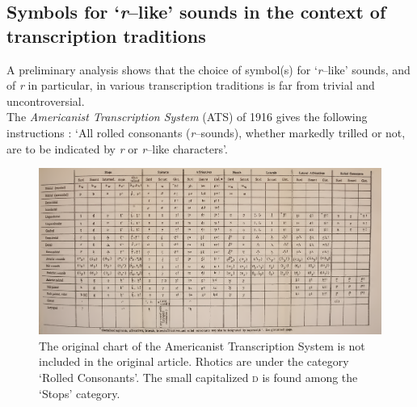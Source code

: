\subsection{Symbols for ‘\textit{r}–like’ sounds in the context of transcription traditions}\label{subsec:lingtrad}

A preliminary analysis shows that the choice of symbol(s) for ‘\textit{r}–like’ sounds, and of \textit{r} in particular, in various transcription traditions is far from trivial and uncontroversial.\\

The \textit{Americanist Transcription System} (ATS) of 1916 gives the following instructions \parencite[13]{boasPhoneticTranscriptionIndian1916}: ‘All rolled consonants (\textit{r}–sounds), whether markedly trilled or not, are to be indicated by \textit{r} or \textit{r}–like characters’.

\begin{figure}
	\centering
	\includegraphics[width=1\linewidth]{jipa/images/americanistChart}
	\caption[Original chart of the Americanist Transcription System \parencite{boasPhoneticTranscriptionIndian1916}]{The original chart of the Americanist Transcription System \parencite[21--22]{boasPhoneticTranscriptionIndian1916} is not included in the original article. Rhotics are under the category ‘Rolled Consonants’. The small capitalized \textsc{d} is found among the ‘Stops’ category.}
	\label{fig:americanistchart}
\end{figure}


